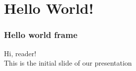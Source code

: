 \section{Hello World!} %


\begin{frame}[t]
\frametitle{Hello world frame}
Hi, reader!\\
This is the initial slide of our presentation

\end{frame}